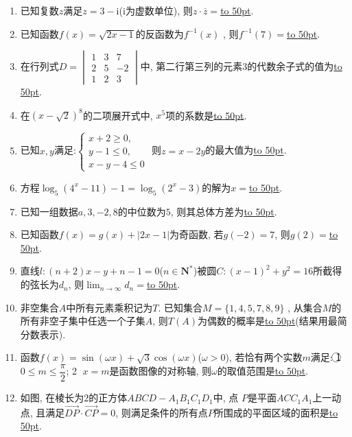\documentclass[10pt,a4paper]{article}
\newcommand{\blank}[1]{\underline{\hbox to #1pt{}}}
\begin{document}
\begin{enumerate}[1.]
\item 已知复数$z$满足$z=3-\mathrm{i}$($\mathrm{i}$为虚数单位), 则$z\cdot \overline z=$\blank{50}.
\item 已知函数$f(x)=\sqrt{2x-1}$的反函数为$f^{-1}(x)$ , 则$f^{-1}(7)=$\blank{50}.
\item 在行列式$D=\begin{vmatrix}1&3&7\\2&5&-2\\1&2&3\end{vmatrix}$中, 第二行第三列的元素$3$的代数余子式的值为\blank{50}.
\item 在$(x-\sqrt 2)^8$的二项展开式中, $x^5$项的系数是\blank{50}.
\item 已知$x,y$满足:$\begin{cases}  x+2\ge 0,  \\y-1\le 0,  \\x-y-4\le 0  \end{cases}$ 则$z=x-2y$的最大值为\blank{50}.
\item 方程$\log_5(4^x-11)-1=\log_5(2^x-3)$的解为$x=$\blank{50}.
\item 已知一组数据$a,3,-2,8$的中位数为$5$, 则其总体方差为\blank{50}.
\item 已知函数$f(x)=g(x)+|2x-1|$为奇函数, 若$g(-2)=7$, 则$g(2)=$\blank{50}.
\item 直线$l:(n+2)x-y+n-1=0$($n\in \mathbf{N}^*$)被圆$C:(x-1)^2+y^2=16$所截得的弦长为$d_n$, 则$\displaystyle\lim_{n\to \infty}d_n=$\blank{50}.
\item 非空集合$A$中所有元素乘积记为$T$. 已知集合$M=\{1,4,5,7,8,9\}$ , 从集合$M$的所有非空子集中任选一个子集$A$, 则$T(A)$为偶数的概率是\blank{50}(结果用最简分数表示).
\item 函数$f(x)=\sin(\omega x)+\sqrt 3\cos (\omega x)$($\omega >0$), 若恰有两个实数$m$满足: \textcircled{1}  $0\le m\le \dfrac{\pi}2$; \textcircled{2} $x=m$是函数图像的对称轴, 则$\omega$的取值范围是\blank{50}.
\item 如图, 在棱长为$2$的正方体$ABCD-A_1B_1C_1D_1$中, 点
$P$是平面$ACC_1A_1$上一动点, 且满足$\overrightarrow{DP}\cdot \overrightarrow{CP}=0$, 则满足条件的所有点$P$所围成的平面区域的面积是\blank{50}.
\begin{center}
\end{center}
\end{enumerate}
\end{document}
